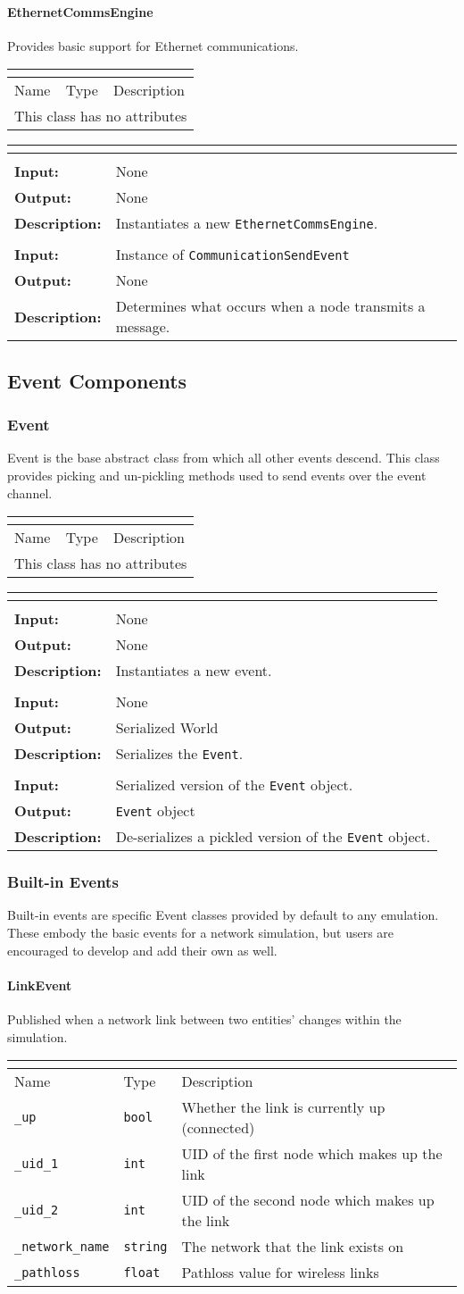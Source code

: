 \documentclass[titlepage]{article}
\newcommand{\operations}[1]{
\begin{center}
    \begin{longtable}{|p{4cm}|p{10cm + 2.0\tabcolsep}|}
    \hline
    \multicolumn{2}{|l|}{\cellcolor[gray]{0.5}{\textbf{Operations}}} \\ \hline
#1
    \end{longtable}
\end{center}
}
\newcommand{\operation}[4]{
    \hline
    \multicolumn{2}{|l|}{\cellcolor[gray]{0.8}{\texttt{#1}}} \\ \hline
    \hspace{7pt}\textbf{Input:} & #2 \\ \hline
    \hspace{7pt}\textbf{Output:} & #3 \\ \hline
    \hspace{7pt}\textbf{Description:} & #4 \\ \hline
}
\newcommand{\noattributes}{
    \begin{center}
        \begin{tabular}{|p{3cm}|p{3cm}|p{8cm}|}
            \multicolumn{3}{|l|}{\cellcolor[gray]{0.5}{\textbf{Attributes}}} \\ \hline
            \rowcolor[gray]{0.8} Name & Type & Description \\ \hline 
            \multicolumn{3}{|c|}{This class has no attributes} \\ \hline
        \end{tabular}
    \end{center}
}
\newcommand{\attributes}[1]{
    \begin{center}
        \begin{tabular}{|p{3.5cm}|p{3.5cm}|p{7cm}|}
            \multicolumn{3}{|l|}{\cellcolor[gray]{0.5}{\textbf{Attributes}}} \\ \hline
            \rowcolor[gray]{0.8} Name & Type & Description \\ \hline 
            #1
        \end{tabular}
    \end{center}
}
\newcommand{\attribute}[3]{
    \texttt{#1} & \texttt{#2} & #3 \\ \hline
}
\begin{document}
\paragraph{EthernetCommsEngine}{Provides basic support for Ethernet communications.}

\noattributes

\operations
{
    \operation{\_\_init\_\_()}{None}{None}{Instantiates a new \texttt{EthernetCommsEngine}.}
    \operation{\_on\_send(event)}{Instance of \texttt{CommunicationSendEvent}}{None}{Determines what occurs when a node transmits a message.}
}

\subsection{Event Components}
\subsubsection{Event}{Event is the base abstract class from which all other events descend.  This class provides picking and un-pickling methods used to send events over the event channel.}

\noattributes

\operations
{
    \operation{\_\_init\_\_()}{None}{None}{Instantiates a new event.}
    \operation{pickle()}{None}{Serialized World}{Serializes the \texttt{Event}.}
    \operation{from\_pickle(pickled)}{Serialized version of the \texttt{Event} object.}{\texttt{Event} object}{De-serializes a pickled version of the \texttt{Event} object.}
}

\subsubsection{Built-in Events}
Built-in events are specific Event classes provided by default to any emulation. These embody the basic events for a network simulation, but users are encouraged to develop and add their own as well.
\paragraph{LinkEvent}{Published when a network link between two entities' changes within the simulation.}

\attributes{
    \attribute{\_up}{bool}{Whether the link is currently up (connected)}
    \attribute{\_uid\_1}{int}{UID of the first node which makes up the link}
    \attribute{\_uid\_2}{int}{UID of the second node which makes up the link}
    \attribute{\_network\_name}{string}{The network that the link exists on}
    \attribute{\_pathloss}{float}{Pathloss value for wireless links}
}
\end{document}
